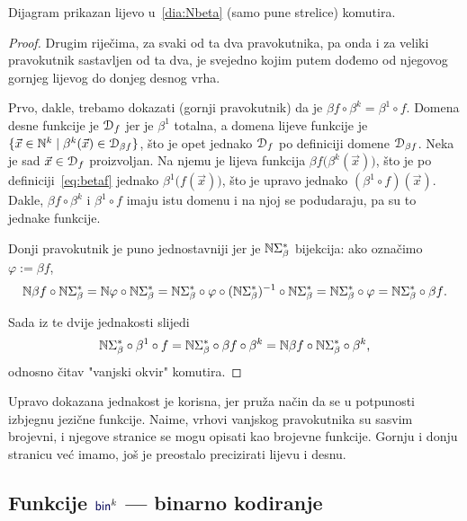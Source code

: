 \begin{lema}[{name=[brojevni-jezični-brojevni dijagram komutira]}]\label{lm:pravkomut}
Dijagram prikazan lijevo u~\eqref{dia:Nbeta} (samo pune strelice) komutira.
\end{lema}
\begin{proof}
Drugim riječima, za svaki od ta dva pravokutnika, pa onda i za veliki pravokutnik sastavljen od ta dva, je svejedno kojim putem dođemo od njegovog gornjeg lijevog do donjeg desnog vrha.

Prvo, dakle, trebamo dokazati (gornji pravokutnik) da je $\beta f\circ\beta^k =\beta^1\circ f$. Domena desne funkcije je $\mathcal D_{f}$ jer je $\beta^1$ totalna, a domena lijeve funkcije je $\{\vec x\in{\mathbb N}^k\mid\beta^k(\vec x)\in\mathcal D_{\beta f}\}$, što je opet jednako $\mathcal D_{f}$ po definiciji domene $\mathcal D_{\beta f}$. Neka je sad $\vec x\in\mathcal D_{f}$ proizvoljan. Na njemu je lijeva funkcija $\beta f\bigl(\beta^k(\vec x)\bigr)$, što je po definiciji~\eqref{eq:betaf} jednako $\beta^1\bigl(f(\vec x)\bigr)$, što je upravo jednako $(\beta^1\circ f)(\vec x)$. Dakle, $\beta f\circ\beta^k$ i $\beta^1\circ f$ imaju istu domenu i na njoj se podudaraju, pa su to jednake funkcije.

Donji pravokutnik je puno jednostavniji jer je ${\mathbb N}\Sigma_\beta^*$ bijekcija: ako označimo $\varphi:=\beta f$,
\begin{equation}
    {\mathbb N}\beta f\circ{\mathbb N}\Sigma_\beta^*={\mathbb N}\varphi\circ{\mathbb N}\Sigma_\beta^*={\mathbb N}\Sigma_\beta^*\circ\varphi\circ({\mathbb N}\Sigma_\beta^*)^{-1}\circ{\mathbb N}\Sigma_\beta^*={\mathbb N}\Sigma_\beta^*\circ\varphi={\mathbb N}\Sigma_\beta^*\circ\beta f\text.
\end{equation}

Sada iz te dvije jednakosti slijedi
\begin{equation}\label{eq:pravkomut}
    {\mathbb N}\Sigma_\beta^*\circ\beta^1\circ f={\mathbb N}\Sigma_\beta^*\circ\beta f\circ\beta^k={\mathbb N}\beta f\circ{\mathbb N}\Sigma_\beta^*\circ\beta^k\text,
\end{equation}
odnosno čitav "\!vanjski okvir" komutira.
\end{proof}

Upravo dokazana jednakost je korisna, jer pruža način da se u potpunosti izbjegnu jezične funkcije. Naime, vrhovi vanjskog pravokutnika su sasvim brojevni, i njegove stranice se mogu opisati kao brojevne funkcije. Gornju i donju stranicu već imamo, još je preostalo precizirati lijevu i desnu.

\subsection{Funkcije \texorpdfstring{$\f{bin}^k$}{bin} --- binarno kodiranje}

